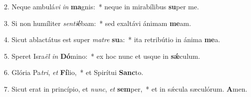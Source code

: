 2. Neque ambulá\textit{vi} \textit{in} \textbf{ma}gnis:~*  neque in mirabílibus \textbf{su}per me.\

3. Si non humíliter \textit{sen}\textit{ti}\textbf{é}bam:~*  sed exaltávi ánimam \textbf{me}am.\

4. Sicut ablactátus est super \textit{ma}\textit{tre} \textbf{su}a:~*  ita retribútio in ánima \textbf{me}a.\

5. Speret Isra\textit{ël} \textit{in} \textbf{Dó}mino:~*  ex hoc nunc et usque in \textbf{sǽ}culum.\

6. Glória Pa\textit{tri}, \textit{et} \textbf{Fí}lio,~*  et Spirítui \textbf{Sanc}to.\

7. Sicut erat in princípio, et \textit{nunc}, \textit{et} \textbf{sem}per,~*  et in sǽcula sæculórum. \textbf{A}men.\

